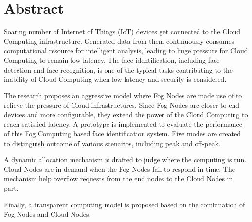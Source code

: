 \chapter*{Abstract}

Soaring number of Internet of Things (IoT) devices get connected to the Cloud Computing infrastructure. Generated data from them continuously consumes computational resource for intelligent analysis, leading to huge pressure for Cloud Computing to remain low latency. The face identification, including face detection and face recognition, is one of the typical tasks contributing to the inability of Cloud Computing when low latency and security is considered.

The research proposes an aggressive model where Fog Nodes are made use of to relieve the pressure of Cloud infrastructures. Since Fog Nodes are closer to end devices and more configurable, they extend the power of the Cloud Computing to reach satisfied latency. A prototype is implemented to evaluate the performance of this Fog Computing based face identification system. Five modes are created to distinguish outcome of various scenarios, including peak and off-peak.

A dynamic allocation mechanism is drafted to judge where the computing is run. Cloud Nodes are in demand when the Fog Nodes fail to respond in time. The mechanism help overflow requests from the end nodes to the Cloud Nodes in part.

Finally, a transparent computing model is proposed based on the combination of Fog Nodes and Cloud Nodes.
